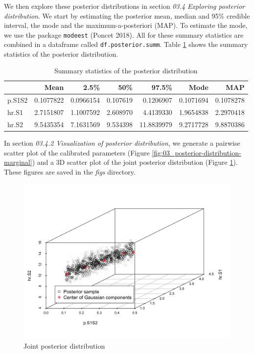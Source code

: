 \documentclass[]{article}
\begin{document}
We then explore these posterior distributions in section \emph{03.4
Exploring posterior distribution}. We start by estimating the posterior
mean, median and 95\% credible interval, the mode and the
maximum-a-posteriori (MAP). To estimate the mode, we use the package
\texttt{modeest} (Poncet 2018). All for these summary statistics are
combined in a dataframe called \texttt{df.posterior.summ}. Table
\ref{tab:SummaryCal} shows the summary statistics of the posterior
distribution.

\begin{table}[t]

\caption{\label{tab:unnamed-chunk-11}Summary statistics of the posterior distribution\label{tab:SummaryCal}}
\centering
\begin{tabular}{l|r|r|r|r|r|r}
\hline
  & Mean & 2.5\% & 50\% & 97.5\% & Mode & MAP\\
\hline
p.S1S2 & 0.1077822 & 0.0966154 & 0.107619 & 0.1206907 & 0.1071694 & 0.1078278\\
\hline
hr.S1 & 2.7151807 & 1.1007592 & 2.608970 & 4.4139330 & 1.9654838 & 2.2970418\\
\hline
hr.S2 & 9.5435354 & 7.1631569 & 9.534398 & 11.8839979 & 9.2717728 & 9.8870386\\
\hline
\end{tabular}
\end{table}

In section \emph{03.4.2 Visualization of posterior distribution}, we
generate a pairwise scatter plot of the calibrated parameters (Figure
\ref{fig:03_posterior-distribution-marginal}) and a 3D scatter plot of
the joint posterior distribution (Figure
\ref{fig:Posterior-distribution-joint}). These figures are saved in the
\emph{figs} directory.

\begin{figure}
\centering
\includegraphics{../figs/03_posterior-distribution-joint.png}
\caption{Joint posterior distribution
\label{fig:Posterior-distribution-joint}}
\end{figure}
\end{document}
